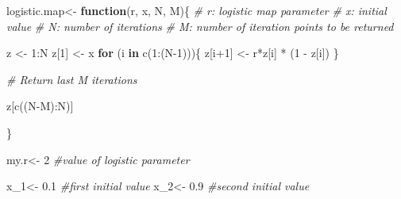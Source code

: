 \documentclass[
  a4paper,
  oneside,
  final]{krantz}
\newenvironment{Shaded}{\begin{snugshade}}{\end{snugshade}}
\newcommand{\CommentTok}[1]{\textcolor[rgb]{0.56,0.35,0.01}{\textit{#1}}}
\newcommand{\ControlFlowTok}[1]{\textcolor[rgb]{0.13,0.29,0.53}{\textbf{#1}}}
\newcommand{\DecValTok}[1]{\textcolor[rgb]{0.00,0.00,0.81}{#1}}
\newcommand{\FloatTok}[1]{\textcolor[rgb]{0.00,0.00,0.81}{#1}}
\newcommand{\FunctionTok}[1]{\textcolor[rgb]{0.00,0.00,0.00}{#1}}
\newcommand{\NormalTok}[1]{#1}
\newcommand{\OtherTok}[1]{\textcolor[rgb]{0.56,0.35,0.01}{#1}}
\newcommand{\SpecialCharTok}[1]{\textcolor[rgb]{0.00,0.00,0.00}{#1}}
\theoremstyle{definition}
\theoremstyle{definition}
\theoremstyle{definition}
\theoremstyle{definition}
\theoremstyle{remark}
\begin{document}
\begin{Shaded}
\begin{Highlighting}[]
\NormalTok{logistic.map}\OtherTok{\textless{}{-}} \ControlFlowTok{function}\NormalTok{(r, x, N, M)\{}
  \CommentTok{\# r: logistic map parameter}
  \CommentTok{\# x: initial value}
  \CommentTok{\# N: number of iterations}
  \CommentTok{\# M: number of iteration points to be returned}

\NormalTok{  z }\OtherTok{\textless{}{-}} \DecValTok{1}\SpecialCharTok{:}\NormalTok{N}
\NormalTok{  z[}\DecValTok{1}\NormalTok{] }\OtherTok{\textless{}{-}}\NormalTok{ x}
  \ControlFlowTok{for}\NormalTok{ (i }\ControlFlowTok{in} \FunctionTok{c}\NormalTok{(}\DecValTok{1}\SpecialCharTok{:}\NormalTok{(N}\DecValTok{{-}1}\NormalTok{)))\{}
\NormalTok{    z[i}\SpecialCharTok{+}\DecValTok{1}\NormalTok{] }\OtherTok{\textless{}{-}}\NormalTok{ r}\SpecialCharTok{*}\NormalTok{z[i] }\SpecialCharTok{*}\NormalTok{ (}\DecValTok{1} \SpecialCharTok{{-}}\NormalTok{ z[i])}
\NormalTok{  \}}

  \CommentTok{\# Return last M iterations}

\NormalTok{  z[}\FunctionTok{c}\NormalTok{((N}\SpecialCharTok{{-}}\NormalTok{M)}\SpecialCharTok{:}\NormalTok{N)]}

\NormalTok{\}}

\NormalTok{my.r}\OtherTok{\textless{}{-}} \DecValTok{2}    \CommentTok{\#value of logistic parameter}

\NormalTok{x\_1}\OtherTok{\textless{}{-}} \FloatTok{0.1}   \CommentTok{\#first initial value}
\NormalTok{x\_2}\OtherTok{\textless{}{-}} \FloatTok{0.9}   \CommentTok{\#second initial value}


\end{Highlighting}
\end{Shaded}
\end{document}
